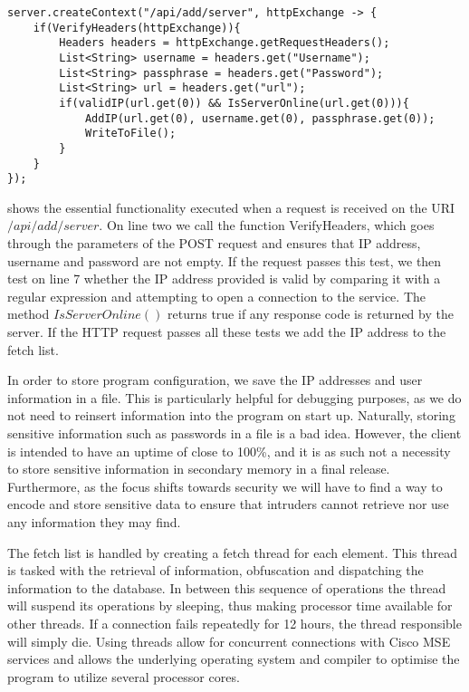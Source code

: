 \begin{lstlisting}[caption={Adding a server to the fetch list},label={lst:add_server},language=inc_Java, mathescape]
server.createContext("/api/add/server", httpExchange -> {
    if(VerifyHeaders(httpExchange)){
        Headers headers = httpExchange.getRequestHeaders();
        List<String> username = headers.get("Username");
        List<String> passphrase = headers.get("Password");
        List<String> url = headers.get("url");
        if(validIP(url.get(0)) && IsServerOnline(url.get(0))){
            AddIP(url.get(0), username.get(0), passphrase.get(0));
            WriteToFile();
        }
    }
});
\end{lstlisting}
 shows the essential functionality executed when a request is received on the URI $/api/add/server$. On line two we call the function VerifyHeaders, which goes through the parameters of the POST request and ensures that IP address, username and password are not empty. If the request passes this test, we then test on line 7 whether the IP address provided is valid by comparing it with a regular expression and attempting to open a connection to the service. The method $IsServerOnline()$ returns true if any response code is returned by the server. If the HTTP request passes all these tests we add the IP address to the fetch list.

In order to store program configuration, we save the IP addresses and user information in a file. This is particularly helpful for debugging purposes, as we do not need to reinsert information into the program on start up. Naturally, storing sensitive information such as passwords in a file is a bad idea. However, the client is intended to have an uptime of close to 100\%, and it is as such not a necessity to store sensitive information in secondary memory in a final release. Furthermore, as the focus shifts towards security we will have to find a way to encode and store sensitive data to ensure that intruders cannot retrieve nor use any information they may find.

The fetch list is handled by creating a fetch thread for each element. This thread is tasked with the retrieval of information, obfuscation and dispatching the information to the database. In between this sequence of operations the thread will suspend its operations by sleeping, thus making processor time available for other threads. If a connection fails repeatedly for 12 hours, the thread responsible will simply die. Using threads allow for concurrent connections with Cisco MSE services and allows the underlying operating system and compiler to optimise the program to utilize several processor cores.